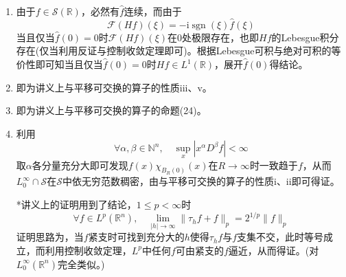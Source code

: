 \documentclass[a4paper,UTF8,fontset=windows]{ctexart}
\newcommand*{\ir}{\mathrm{i}}
\DeclareMathOperator{\sgn}{sgn}
\begin{document}
\begin{enumerate}
    \item 由于$f\in\mathcal{S}(\mathbb{R})$，必然有$\hat{f}$连续，而由于
    $$\mathcal{F}(Hf)(\xi)=-\ir\sgn(\xi)\hat{f}(\xi)$$
    当且仅当$\hat{f}(0)=0$时$\mathcal{F}(Hf)(\xi)$在0处极限存在，也即$Hf$的Lebesgue积分存在(仅当利用反证与控制收敛定理即可)。根据Lebesgue可积与绝对可积的等价性即可知当且仅当$\hat{f}(0)=0$时$Hf\in L^1(\mathbb{R})$，展开$\hat{f}(0)$得结论。

    \item 即为讲义上与平移可交换的算子的性质iii、v。
    \item 即为讲义上与平移可交换的算子的命题(24)。
    \item 利用
    $$\forall\alpha,\beta\in\mathbb{N}^n,\quad\sup_x|x^\alpha D^\beta f|<\infty$$
    取$\alpha$各分量充分大即可发现$f(x)\chi_{B_R(0)}(x)$在$R\to\infty$时一致趋于$f$，从而$L_0^\infty\cap\mathcal{S}$在$\mathcal{S}$中依无穷范数稠密，由与平移可交换的算子的性质i、ii即可得证。

    *讲义上的证明用到了结论，$1\le p<\infty$时
    $$\forall f\in L^p(\mathbb{R}^n),\quad\lim_{|h|\to\infty}\|\tau_hf+f\|_p=2^{1/p}\|f\|_p$$
    证明思路为，当$f$紧支时可找到充分大的$h$使得$\tau_hf$与$f$支集不交，此时等号成立，而利用控制收敛定理，$L^p$中任何$f$可由紧支的$f$逼近，从而得证。(对$L_0^\infty(\mathbb{R}^n)$完全类似。)
\end{enumerate}
\end{document}
